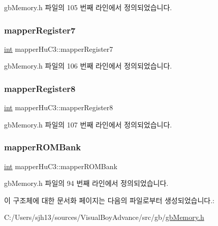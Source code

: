 gb\+Memory.\+h 파일의 105 번째 라인에서 정의되었습니다.

\mbox{\label{structmapper_hu_c3_a3d611f8b421806dd7b684dc6c6859107}} 
\subsubsection{\texorpdfstring{mapper\+Register7}{mapperRegister7}}
{\footnotesize\ttfamily \mbox{\hyperlink{_util_8cpp_a0ef32aa8672df19503a49fab2d0c8071}{int}} mapper\+Hu\+C3\+::mapper\+Register7}



gb\+Memory.\+h 파일의 106 번째 라인에서 정의되었습니다.

\mbox{\label{structmapper_hu_c3_a7a22f2e1258e8b5c86e359ffd54eef85}} 
\subsubsection{\texorpdfstring{mapper\+Register8}{mapperRegister8}}
{\footnotesize\ttfamily \mbox{\hyperlink{_util_8cpp_a0ef32aa8672df19503a49fab2d0c8071}{int}} mapper\+Hu\+C3\+::mapper\+Register8}



gb\+Memory.\+h 파일의 107 번째 라인에서 정의되었습니다.

\mbox{\label{structmapper_hu_c3_a0e4220842438d77ce5ee80686ebd0e87}} 
\subsubsection{\texorpdfstring{mapper\+R\+O\+M\+Bank}{mapperROMBank}}
{\footnotesize\ttfamily \mbox{\hyperlink{_util_8cpp_a0ef32aa8672df19503a49fab2d0c8071}{int}} mapper\+Hu\+C3\+::mapper\+R\+O\+M\+Bank}



gb\+Memory.\+h 파일의 94 번째 라인에서 정의되었습니다.



이 구조체에 대한 문서화 페이지는 다음의 파일로부터 생성되었습니다.\+:\begin{DoxyCompactItemize}
\item 
C\+:/\+Users/sjh13/sources/\+Visual\+Boy\+Advance/src/gb/\mbox{\hyperlink{gb_memory_8h}{gb\+Memory.\+h}}\end{DoxyCompactItemize}
